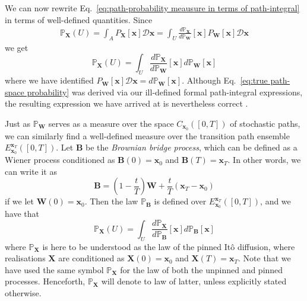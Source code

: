 We can now rewrite Eq.~\ref{eq:path-probability meausure in terms of path-integral} in terms of well-defined quantities. Since
\begin{equation}
\begin{aligned}
\mathbb{P}_\mathbf{X}(U)  =  \int_A P_\mathbf{X}[\mathbf{x}] \mathcal{D} \mathbf{x} 
 = \int_U \frac{d \mathbb{P}_\mathbf{X}}{d \mathbb{P}_\mathbf{W}}[\mathbf{x}] P_\mathbf{W}[\mathbf{x}] \mathcal{D} \mathbf{x} 
\end{aligned}
\end{equation}
we get
\begin{equation} \label{eq:true path-space probability}
\mathbb{P}_\mathbf{X}(U) = \int_U \frac{d \mathbb{P}_\mathbf{X}}{d \mathbb{P}_\mathbf{W}}[\mathbf{x}] d \mathbb{P}_\mathbf{W}[\mathbf{x}]
\end{equation}
where we have identified $P_\mathbf{W}[\mathbf{x}] \mathcal{D} \mathbf{x} = d \mathbb{P}_\mathbf{W}[\mathbf{x}]$. Although Eq.~\ref{eq:true path-space probability} was derived via our ill-defined formal path-integral expressions, the resulting expression we have arrived at is nevertheless correct \citep{beskosMCMCMETHODSDIFFUSION2008a, hairerAnalysisSPDEsArising2005a, hairerAnalysisSPDEsArising2007a}.

Just as $\mathbb{P}_\mathbf{W}$ serves as a measure over the space $C_{\mathbf{x}_0}([0,T])$ of stochastic paths, we can similarly find a well-defined measure over the transition path ensemble $E_{\mathbf{x}_0}^{\mathbf{x}_T}([0,T])$. Let $\mathbf{B}$ be the \textit{Brownian bridge process}, which can be defined as a Wiener process conditioned as $\mathbf{B}(0) = \mathbf{x}_0$ and $\mathbf{B}(T) = \mathbf{x}_T$. In other words, we can write it as
\begin{equation}
	\mathbf{B} = \left(1 - \frac{t}{T}\right) \mathbf{W} + \frac{t}{T} (\mathbf{x}_T - \mathbf{x}_0)
\end{equation}
if we let $\mathbf{W}(0) = \mathbf{x}_0$. Then the law $\mathbb{P}_\mathbf{B}$ is defined over $E_{\mathbf{x}_0}^{\mathbf{x}_T}([0,T])$, and we have that \citep{beskosMCMCMETHODSDIFFUSION2008a}
\begin{equation} \label{eq:true path-space probability of TPE}
\mathbb{P}_\mathbf{X}(U) = \int_U \frac{d \mathbb{P}_\mathbf{X}}{d \mathbb{P}_\mathbf{B}}[\mathbf{x}] d \mathbb{P}_\mathbf{B}[\mathbf{x}]
\end{equation}
where $\mathbb{P}_\mathbf{X}$ is here to be understood as the law of the pinned It\^{o} diffusion, where realisations $\mathbf{X}$ are conditioned as $\mathbf{X}(0) = \mathbf{x}_0$ and $\mathbf{X}(T) = \mathbf{x}_T$. Note that we have used the same symbol $\mathbb{P}_\mathbf{X}$ for the law of both the unpinned and pinned processes. Henceforth, $\mathbb{P}_\mathbf{X}$ will denote to law of latter, unless explicitly stated otherwise.

